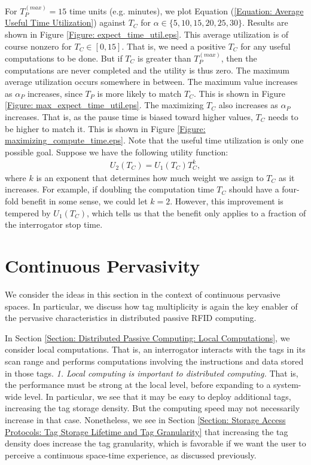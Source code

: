 For $T_P^{(max)} = 15$ time units (e.g. minutes), we plot Equation (\ref{Equation: Average Useful Time Utilization}) against $T_C$ for $\alpha \in \{5, 10, 15, 20, 25, 30\}$. Results are shown in Figure \ref{Figure: expect_time_util.eps}. This average utilization is of course nonzero for $T_C \in \left[0, 15\right]$. That is, we need a positive $T_C$ for any useful computations to be done. But if $T_C$ is greater than $T_P^{(max)}$, then the computations are never completed and the utility is thus zero. The maximum average utilization occurs somewhere in between. The maximum value increases as $\alpha_P$ increases, since $T_P$ is more likely to match $T_C$. This is shown in Figure \ref{Figure: max_expect_time_util.eps}. The maximizing $T_C$ also increases as $\alpha_P$ increases. That is, as the pause time is biased toward higher values, $T_C$ needs to be higher to match it. This is shown in Figure \ref{Figure: maximizing_compute_time.eps}.
Note that the useful time utilization is only one possible goal. Suppose we have the following utility function:
\begin{eqnarray}
U_2\left(T_C\right) = U_1\left(T_C\right) T_C^k,
\end{eqnarray}
where $k$ is an exponent that determines how much weight we assign to $T_C$ as it increases. For example, if doubling the computation time $T_C$ should have a four-fold benefit in some sense, we could let $k = 2$. However, this improvement is tempered by $U_1\left(T_C\right)$, which tells us that the benefit only applies to a fraction of the interrogator stop time.

\section{Continuous Pervasivity}
We consider the ideas in this section in the context of continuous pervasive spaces. In particular, we discuss how tag multiplicity is again the key enabler of the pervasive characteristics in distributed passive RFID computing.

In Section \ref{Section: Distributed Passive Computing: Local Computations}, we consider local computations. That is, an interrogator interacts with the tags in its scan range and performs computations involving the instructions and data stored in those tags. \emph{1. Local computing is important to distributed computing.} That is, the performance must be strong at the local level, before expanding to a system-wide level. In particular, we see that it may be easy to deploy additional tags, increasing the tag storage density. But the computing speed may not necessarily increase in that case. Nonetheless, we see in Section \ref{Section: Storage Access Protocols: Tag Storage Lifetime and Tag Granularity} that increasing the tag density does increase the tag granularity, which is favorable if we want the user to perceive a continuous space-time experience, as discussed previously.

